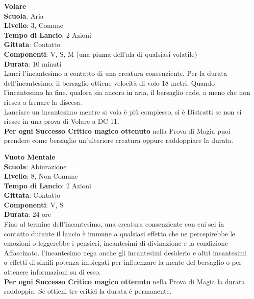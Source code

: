 \begin{multicols}{2}
\medskip\textbf{Volare}\\
\textbf{Scuola}: Aria\\
\textbf{Livello}: 3, Comune\\
\textbf{Tempo di Lancio}: 2 Azioni\\
\textbf{Gittata}: Contatto\\
\textbf{Componenti}: V, S, M (una piuma dell'ala di qualsiasi volatile)\\
\textbf{Durata}: 10 minuti \\
Lanci l'incantesimo a contatto di una creatura consenziente. Per la durata dell'incantesimo, il bersaglio ottiene velocità di volo 18 metri. Quando l'incantesimo ha fine, qualora sia ancora in aria, il bersaglio cade, a meno che non riesca a frenare la discesa.\\
Lanciare un incantesimo mentre si vola è più complesso, si è Distratti se non si riesce in una prova di Volare a DC 11.\\
\textbf{Per ogni Successo Critico magico ottenuto} nella Prova di Magia puoi prendere come bersaglio un'ulteriore creatura oppure raddoppiare la durata.

\medskip\textbf{Vuoto Mentale}\\
\textbf{Scuola}: Abiurazione\\
\textbf{Livello}: 8, Non Comune\\
\textbf{Tempo di Lancio}: 2 Azioni\\
\textbf{Gittata}: Contatto\\
\textbf{Componenti}: V, S\\
\textbf{Durata}: 24 ore\\
Fino al termine dell'incantesimo, una creatura consenziente con cui sei in contatto durante il lancio è immune a qualsiasi effetto che ne percepirebbe le emozioni o leggerebbe i pensieri, incantesimi di divinazione e la condizione Affascinato. l'incantesimo nega anche gli incantesimi desiderio e altri incantesimi o effetti di simili potenza impiegati per
influenzare la mente del bersaglio o per ottenere informazioni su di esso.\\
\textbf{Per ogni Successo Critico magico ottenuto} nella Prova di Magia la durata raddoppia. Se ottieni tre critici la durata è permanente.


\end{multicols}

